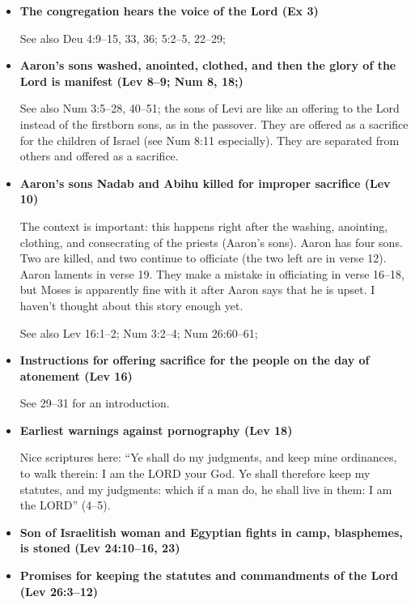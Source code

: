 \begin{itemize}

\item \textbf{The congregation hears the voice of the Lord (Ex 3)}

	See also Deu 4:9--15, 33, 36; 5:2--5, 22--29;

\item \textbf{Aaron's sons washed, anointed, clothed, and then the glory of the Lord is manifest (Lev 8--9; Num 8, 18;)}

	See also Num 3:5--28, 40--51; the sons of Levi are like an offering to the Lord instead of the firstborn sons, as in the passover. They are offered as a sacrifice for the children of Israel (see Num 8:11 especially). They are separated from others and offered as a sacrifice.

\item \textbf{Aaron's sons Nadab and Abihu killed for improper sacrifice (Lev 10)}

	The context is important: this happens right after the washing, anointing, clothing, and consecrating of the priests (Aaron's sons). Aaron has four sons. Two are killed, and two continue to officiate (the two left are in verse 12). Aaron laments in verse 19. They make a mistake in officiating in verse 16--18, but Moses is apparently fine with it after Aaron says that he is upset. I haven't thought about this story enough yet.

	See also Lev 16:1--2; Num 3:2--4; Num 26:60--61;

\item \textbf{Instructions for offering sacrifice for the people on the day of atonement (Lev 16)}

	See 29--31 for an introduction.

\item \textbf{Earliest warnings against pornography (Lev 18)}

	Nice scriptures here: ``Ye shall do my judgments, and keep mine ordinances, to walk therein: I am the LORD your God. Ye shall therefore keep my statutes, and my judgments: which if a man do, he shall live in them: I am the LORD'' (4--5).

\item \textbf{Son of Israelitish woman and Egyptian fights in camp, blasphemes, is stoned (Lev 24:10--16, 23)}

\item \textbf{Promises for keeping the statutes and commandments of the Lord (Lev 26:3--12)}


\end{itemize}
